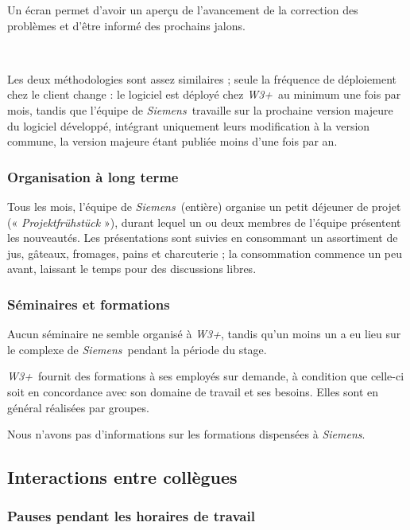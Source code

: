 \documentclass[a4paper, oneside, 12pt]{article}
\def\www{\emph{W3+}}
\def\siemens{\emph{Siemens}}
\begin{document}
Un écran permet d’avoir un aperçu de l’avancement de la correction des problèmes et d’être informé des prochains jalons.

\ 

Les deux méthodologies sont assez similaires ; seule la fréquence de déploiement chez le client change : le logiciel est déployé chez \www\ au minimum une fois par mois, tandis que l’équipe de \siemens\ travaille sur la prochaine version majeure du logiciel développé, intégrant uniquement leurs modification à la version commune, la version majeure étant publiée moins d’une fois par an.

\newpage

\subsubsection{Organisation à long terme}

Tous les mois, l’équipe de \siemens\ (entière) organise un petit déjeuner de projet (« \textit{Projektfrühstück} »), durant lequel un ou deux membres de l’équipe présentent les nouveautés. Les présentations sont suivies en consommant un assortiment de jus, gâteaux, fromages, pains et charcuterie ; la consommation commence un peu avant, laissant le temps pour des discussions libres.

\subsubsection{Séminaires et formations}

Aucun séminaire ne semble organisé à \www, tandis qu’un moins un a eu lieu sur le complexe de \siemens\ pendant la période du stage.

\www\ fournit des formations à ses employés sur demande, à condition que celle-ci soit en concordance avec son domaine de travail et ses besoins. Elles sont en général réalisées par groupes.

Nous n’avons pas d’informations sur les formations dispensées à \siemens.

\vfill

\subsection{Interactions entre collègues}

\subsubsection{Pauses pendant les horaires de travail}
\end{document}
